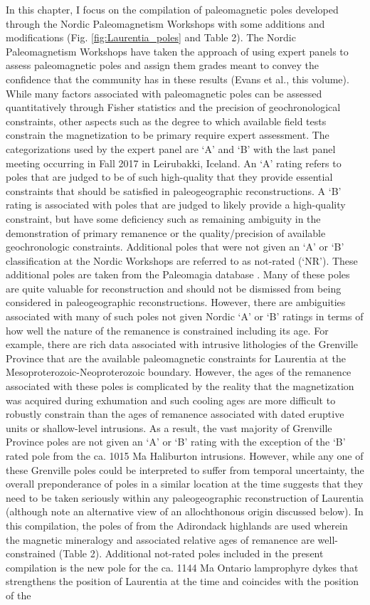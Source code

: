 \documentclass[11pt,letterpaper]{article}
\begin{document}
In this chapter, I focus on the compilation of paleomagnetic poles developed through the Nordic Paleomagnetism Workshops with some additions and modifications (Fig. \ref{fig:Laurentia_poles} and Table 2). The Nordic Paleomagnetism Workshops have taken the approach of using expert panels to assess paleomagnetic poles and assign them grades meant to convey the confidence that the community has in these results (Evans et al., this volume). While many factors associated with paleomagnetic poles can be assessed quantitatively through Fisher statistics and the precision of geochronological constraints, other aspects such as the degree to which available field tests constrain the magnetization to be primary require expert assessment. The categorizations used by the expert panel are `A' and `B' with the last panel meeting occurring in Fall 2017 in Leirubakki, Iceland. An `A' rating refers to poles that are judged to be of such high-quality that they provide essential constraints that should be satisfied in paleogeographic reconstructions. A `B' rating is associated with poles that are judged to likely provide a high-quality constraint, but have some deficiency such as remaining ambiguity in the demonstration of primary remanence or the quality/precision of available geochronologic constraints. Additional poles that were not given an `A' or `B' classification at the Nordic Workshops are referred to as not-rated (`NR'). These additional poles are taken from the Paleomagia database \citep{Veikkolainen2014a}. Many of these poles are quite valuable for reconstruction and should not be dismissed from being considered in paleogeographic reconstructions. However, there are ambiguities associated with many of such poles not given Nordic `A' or `B' ratings in terms of how well the nature of the remanence is constrained including its age. For example, there are rich data associated with intrusive lithologies of the Grenville Province that are the available paleomagnetic constraints for Laurentia at the Mesoproterozoic-Neoproterozoic boundary. However, the ages of the remanence associated with these poles is complicated by the reality that the magnetization was acquired during exhumation and such cooling ages are more difficult to robustly constrain than the ages of remanence associated with dated eruptive units or shallow-level intrusions. As a result, the vast majority of Grenville Province poles are not given an `A' or `B' rating with the exception of the `B' rated pole from the ca. 1015 Ma Haliburton intrusions. However, while any one of these Grenville poles could be interpreted to suffer from temporal uncertainty, the overall preponderance of poles in a similar location at the time suggests that they need to be taken seriously within any paleogeographic reconstruction of Laurentia (although note an alternative view of an allochthonous origin discussed below). In this compilation, the poles of \cite{Brown2012a} from the Adirondack highlands are used wherein the magnetic mineralogy and associated relative ages of remanence are well-constrained (Table 2). Additional not-rated poles included in the present compilation is the new pole for the ca. 1144 Ma Ontario lamprophyre dykes \citep{Piispa2018a} that strengthens the position of Laurentia at the time and coincides with the position of the 
\end{document}
